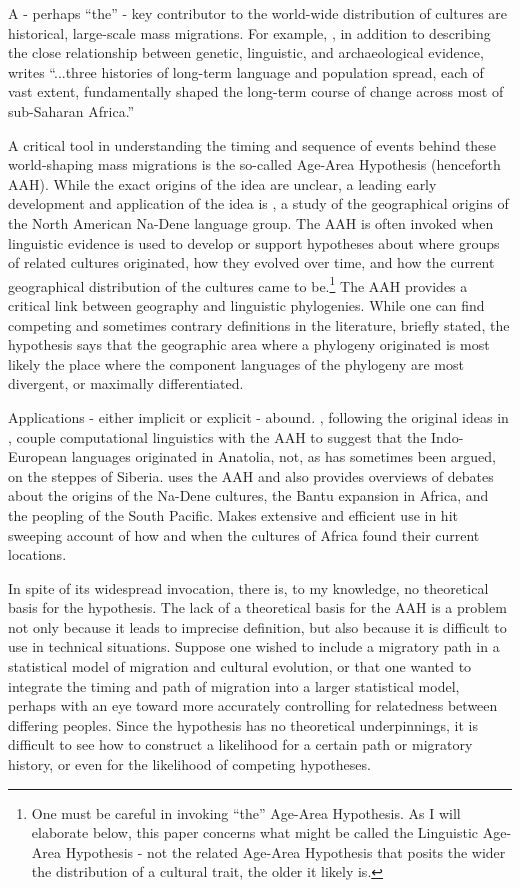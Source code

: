 \documentclass[11pt]{article}
\begin{document}
A - perhaps ``the'' - key contributor to the world-wide distribution of cultures are historical, large-scale mass migrations. For example, \cite[p. 144]{bellwood13}, in addition to describing the close relationship between genetic, linguistic, and archaeological evidence, writes ``...three histories of long-term language and population spread, each of vast extent, fundamentally shaped the long-term course of change across most of sub-Saharan Africa.'' 



A critical tool in understanding the timing and sequence of events behind these world-shaping mass migrations is the so-called Age-Area Hypothesis (henceforth AAH). While the exact origins of the idea are unclear, a leading early development and application of the idea is \cite{sapir16}, a study of the geographical origins of the North American Na-Dene language group. The AAH is often invoked when linguistic evidence is used to develop or support hypotheses about where groups of related  cultures originated, how they evolved over time, and how the current geographical distribution of the cultures came to be.\footnote{One must be careful in invoking ``the'' Age-Area Hypothesis. As I will elaborate below, this paper concerns what might be called the Linguistic Age-Area Hypothesis - not the related Age-Area Hypothesis that posits the wider the distribution of a cultural trait, the older it likely is.} The AAH provides a critical link between geography and linguistic phylogenies. While one can find competing and sometimes contrary definitions in the literature, briefly stated, the hypothesis says that the geographic area where a phylogeny originated is most likely the place where the component languages of the phylogeny are most divergent, or maximally differentiated.

Applications - either implicit or explicit  - abound. \cite{atkinson03}, following the original ideas in \cite{dogolpolsky88}, couple computational linguistics with the AAH to suggest that the Indo-European languages originated in Anatolia, not, as has sometimes been argued, on the steppes of Siberia. \cite{ruhlen94} uses the AAH and also provides overviews of debates about the origins of the Na-Dene cultures, the Bantu expansion in Africa, and the peopling of the South Pacific. \cite{ehret01} Makes extensive and efficient use in hit sweeping account of how and when the cultures of Africa found their current locations.

In spite of its widespread invocation, there is, to my knowledge, no theoretical basis for the hypothesis. The lack of a theoretical basis for the  AAH is a problem not only because it leads to imprecise definition, but also because it is difficult to use in technical situations. Suppose one wished to include a migratory path in a statistical model of migration and cultural evolution, or that one wanted to integrate the timing and path of migration into a larger statistical model, perhaps with an eye toward more accurately controlling for relatedness between differing peoples. Since the hypothesis has no theoretical underpinnings, it is difficult to see how to construct a likelihood for a certain path or migratory history, or even for the likelihood of competing hypotheses.
\end{document}
